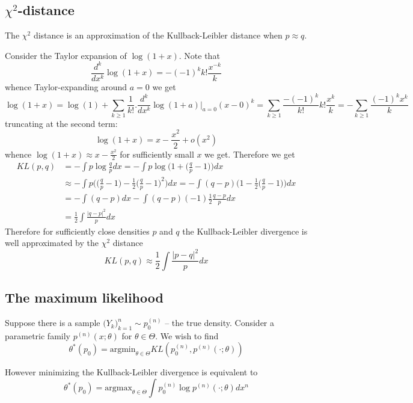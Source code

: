 \documentclass[a4paper]{article}
\begin{document}

\subsection{$\chi^2$-distance} %
\label{sub:chi2_distance}

The $\chi^2$ distance is an approximation of the Kullback-Leibler distance when $p\approx q$.

Consider the Taylor expansion of $\log(1+x)$. Note that 
\[\frac{d^k}{dx^k} \log(1+x) = -(-1)^kk!\frac{x^{-k}}{k}\]
whence Taylor-expanding around $a=0$ we get
\[\log(1+x) = \log(1) + \sum_{k\geq1} \frac{1}{k!}\bigg.\frac{d^k}{dx^k} \log(1+a)\bigg\rvert_{a=0} (x-0)^k = \sum_{k\geq1} \frac{-(-1)^k}{k!}k!\frac{x^k}{k} = -\sum_{k\geq1} \frac{(-1)^kx^k}{k}\]
truncating at the second term:
\[\log(1+x) = x - \frac{x^2}{2} + o(x^2) \]
whence $\log(1+x)\approx x-\frac{x^2}{2}$ for sufficiently small $x$ we get.
Therefore we get
\begin{align*}
	KL(p,q) &= -\int p\log\frac{q}{p}dx = -\int p \log \Big(1+\big(\frac{q}{p}-1\big)\Big) dx \\
	& \approx -\int p \Big(\big(\frac{q}{p}-1\big) - \frac{1}{2} \big(\frac{q}{p}-1\big)^2 \Big) dx = -\int (q-p) \Big(1 - \frac{1}{2} \big(\frac{q}{p}-1\big) \Big) dx \\
	& = -\int (q-p) dx - \int (q-p) (-1) \frac{1}{2} \frac{q-p}{p} dx\\
	& = \frac{1}{2}\int \frac{|q-p|^2}{p} dx
\end{align*}
Therefore for sufficiently close densities $p$ and $q$ the Kullback-Leibler divergence is well approximated by the $\chi^2$ distance
\[KL(p,q) \approx \frac{1}{2}\int \frac{|p-q|^2}{p}dx\]


\subsection{The maximum likelihood} %
\label{sub:the_maximum_likelihood}

Suppose there is a sample $\big(Y_k\big)_{k=1}^n\sim p^{(n)}_0$ -- the true density. Consider a parametric family $p^{(n)}(x;\theta)$ for $\theta\in \Theta$.
We wish to find 
\[\theta^*(p_0)=\text{argmin}_{\theta\in \Theta} KL(p^{(n)}_0, p^{(n)}(\cdot;\theta))\]

However minimizing the Kullback-Leibler divergence is equivalent to 
\[\theta^*(p_0)=\text{argmax}_{\theta\in \Theta} \int p^{(n)}_0 \log p^{(n)}(\cdot;\theta) dx^n\]
\end{document}
